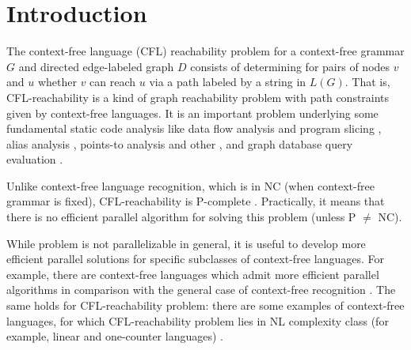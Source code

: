 \documentclass{ws-ijfcs}
\begin{document}

\section{Introduction}
\label{intro}
The context-free language (CFL) reachability problem for a context-free grammar $G$ and directed edge-labeled graph $D$ consists of determining for pairs of nodes  $v$ and $u$ whether $v$ can reach $u$ via a path labeled by a string in $L(G)$.  That is, CFL-reachability is a kind of graph reachability problem with path constraints given by context-free languages. It is an important problem underlying some fundamental static code analysis like data flow analysis and program slicing \cite{RepsBasic}, alias analysis \cite*{Chatterjee, alias}, points-to analysis \cite{Incremental} and other \cite{Cai, android, typeflow}, and graph database query evaluation \cite{Azimov, GrigorevRagozina, HellingsCFPQ, RDF}.


Unlike context-free language recognition, which is in NC (when context-free grammar is fixed), CFL-reachability is P-complete \cite{ RepSeq, Yannakakis}. Practically, it means that there is no efficient parallel algorithm for solving this problem (unless P $\neq$ NC). 


While problem is not parallelizable in general, it is useful to develop more efficient parallel solutions for specific subclasses of context-free languages. For example, there are context-free languages which admit more efficient parallel algorithms in comparison with the general case of context-free recognition \cite{IBARRA, IBARRA2, Okhotin2014ComplexityOI}.  The same holds for CFL-reachability problem: there are some examples of context-free languages, for which CFL-reachability problem lies in NL complexity class (for example, linear and one-counter languages) \cite{labelledGraphs, LReach, Regularrealizability}. 
\end{document}
